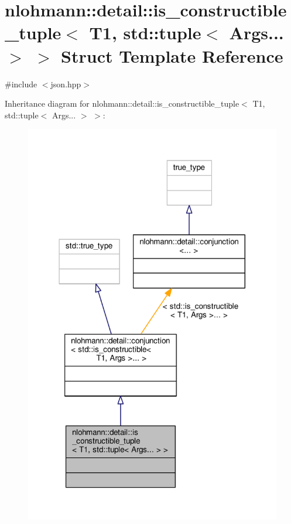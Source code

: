 \hypertarget{structnlohmann_1_1detail_1_1is__constructible__tuple_3_01T1_00_01std_1_1tuple_3_01Args_8_8_8_01_4_01_4}{}\section{nlohmann\+:\+:detail\+:\+:is\+\_\+constructible\+\_\+tuple$<$ T1, std\+:\+:tuple$<$ Args... $>$ $>$ Struct Template Reference}
\label{structnlohmann_1_1detail_1_1is__constructible__tuple_3_01T1_00_01std_1_1tuple_3_01Args_8_8_8_01_4_01_4}


{\ttfamily \#include $<$json.\+hpp$>$}



Inheritance diagram for nlohmann\+:\+:detail\+:\+:is\+\_\+constructible\+\_\+tuple$<$ T1, std\+:\+:tuple$<$ Args... $>$ $>$\+:
\nopagebreak
\begin{figure}[H]
\begin{center}
\leavevmode
\includegraphics[width=318pt]{structnlohmann_1_1detail_1_1is__constructible__tuple_3_01T1_00_01std_1_1tuple_3_01Args_8_8_8_01_4_01_4__inherit__graph}
\end{center}
\end{figure}


